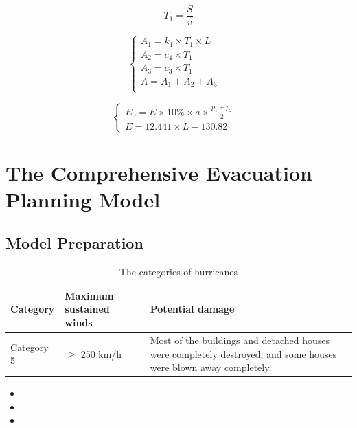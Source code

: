 \documentclass{mcmthesis}
\begin{document}
\begin{equation}\label{4}
T_1=\frac{S}{v}
\end{equation}


			\begin{equation}
			\left\{
			\begin{array}{lr}

A_1=k_1 \times T_1\times L  &\\
A_2=c_4  \times T_1  &\\
A_3=c_3  \times T_1 &\\
A=A_1+A_2+A_3 \\		
			\end{array}
			\right.
			\end{equation}



\begin{equation}
\left\{
\begin{array}{lr}
E_0=E \times 10\% \times a \times \frac{p_1+p_2}{2} &\\
E=12.441\times L -130.82
\end{array}
\right.
\end{equation}


			

\section{The Comprehensive Evacuation Planning Model}
\subsection{Model Preparation}
\begin{table}[!ht]
\caption{The categories of hurricanes}
 \renewcommand\arraystretch{1.5}
 \setlength{\abovecaptionskip}{0pt}%
\setlength{\belowcaptionskip}{10pt}%
\begin{center}
\begin{tabular}{p{}p{}m{}}
\toprule[1.5pt]
Category& Maximum sustained winds & Potential damage \\
 \midrule

  Category 5 & $ \geq $ 250 km/h &   Most of the buildings and detached houses were completely destroyed, and some houses were blown away completely. \\  \bottomrule[1.5pt]
 \end{tabular}
 \end{center} 
 \end{table}
\begin{itemize}

\item 
\item 
\item \end{itemize}
\end{document}
